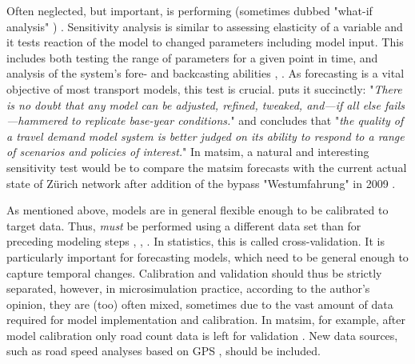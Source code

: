 Often neglected, but important, is performing  (sometimes dubbed "what-if analysis" \citep[][p.155]{Kleijnen_EJOR_1995}) \citep[][]{KurthEtAl_TRBTDF_2006, CambridgeSystematics_manual_2008, CFD_TRB_2007}. Sensitivity analysis is similar to assessing elasticity of a variable \citep[][p.3f]{WegmannEverett_TechRep_CTRUT_2008} and it tests reaction of the model to changed parameters including model input. This includes both testing the range of parameters for a given point in time, and analysis of the system's fore- and backcasting abilities \citep[e.g.,][p.56]{CFD_TRB_2007}, \citep[][]{CambridgeSystematics_manual_2008}. As forecasting is a vital objective of most transport models, this test is crucial. \citet[][p.158]{PendyalaBhat_TRBTDF_2006} puts it succinctly: "\emph{There is no doubt that any model can be adjusted, refined, tweaked, and---if all else fails---hammered to replicate base-year conditions.}" and concludes that "\emph{the quality of a travel demand model system is better judged on its ability to respond to a range of scenarios and policies of interest.}" In \gls{matsim}, a natural and interesting sensitivity test would be to compare the \gls{matsim} forecasts with the current actual state of Zürich network after addition of the bypass "Westumfahrung" in 2009 \citep[][]{BalmerEtAl_ResRep_bdktzrh_2009, Westumfahrung_Webpage_2008}.

As mentioned above, models are in general flexible enough to be calibrated to target data. Thus,  \emph{must} be performed using a different data set than for preceding modeling steps \citep[][p.1]{CambridgeSystematics_manual_2008}, \citep[][p.56]{CFD_TRB_2007}, \citep[][p.18]{OrtuzarWillumsen_2001}. In statistics, this is called cross-validation. It is particularly important for forecasting models, which need to be general enough to capture temporal changes. Calibration and validation should thus be strictly separated, however, in microsimulation practice, according to the author's opinion, they are (too) often mixed, sometimes due to the vast amount of data required for model implementation and calibration. In \gls{matsim}, for example, after model calibration only road count data is left for validation \citep[][]{HorniEtAl_STRC_2009}. New data sources, such as road speed analyses based on GPS \citep[][]{HackneyEtAl_JGS_2007}, should be included.

